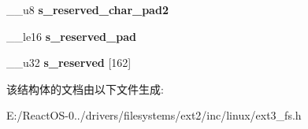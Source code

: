 \begin{DoxyCompactItemize}
\item 
\mbox{\label{structext3__super__block_a335251819dec24cc37c35c491faa7637}} 
\+\_\+\+\_\+u8 {\bfseries s\+\_\+reserved\+\_\+char\+\_\+pad2}
\item 
\mbox{\label{structext3__super__block_a9708bea80e7cd6bd2138e8131ec86649}} 
\+\_\+\+\_\+le16 {\bfseries s\+\_\+reserved\+\_\+pad}
\item 
\mbox{\label{structext3__super__block_a8a939db02ef2eca935f9da26dc89c846}} 
\+\_\+\+\_\+u32 {\bfseries s\+\_\+reserved} \mbox{[}162\mbox{]}
\end{DoxyCompactItemize}


该结构体的文档由以下文件生成\+:\begin{DoxyCompactItemize}
\item 
E\+:/\+React\+O\+S-\/0../drivers/filesystems/ext2/inc/linux/ext3\+\_\+fs.\+h\end{DoxyCompactItemize}
